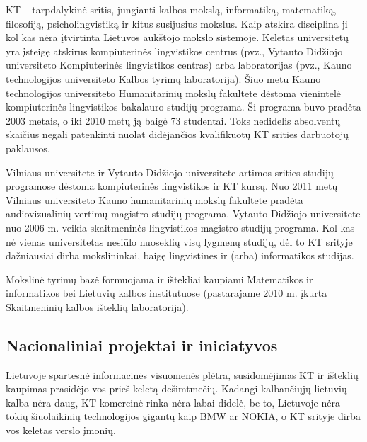 \begin{multicols}{2}
KT – tarpdalykinė sritis, jungianti kalbos mokslą, informatiką, matematiką, filosofiją, psicholingvistiką ir kitus susijusius mokslus. Kaip atskira disciplina ji kol kas nėra įtvirtinta Lietuvos aukštojo mokslo sistemoje. Keletas universitetų yra įsteigę atskirus kompiuterinės lingvistikos centrus (pvz., Vytauto Didžiojo universiteto Kompiuterinės lingvistikos centras) arba laboratorijas (pvz., Kauno technologijos universiteto Kalbos tyrimų laboratorija). Šiuo metu Kauno technologijos universiteto Humanitarinių mokslų fakultete dėstoma vienintelė kompiuterinės lingvistikos bakalauro studijų programa. Ši programa buvo pradėta 2003 metais, o iki 2010 metų ją baigė 73 studentai. Toks nedidelis absolventų skaičius negali patenkinti nuolat didėjančios kvalifikuotų KT srities darbuotojų paklausos.  

    Vilniaus universitete ir Vytauto Didžiojo universitete artimos srities studijų programose dėstoma kompiuterinės lingvistikos ir KT kursų. Nuo 2011 metų Vilniaus universiteto Kauno humanitarinių mokslų fakultete pradėta audiovizualinių vertimų magistro studijų programa. Vytauto Didžiojo universitete nuo 2006 m. veikia skaitmeninės lingvistikos magistro studijų programa. Kol kas nė vienas universitetas nesiūlo nuoseklių visų lygmenų studijų, dėl to KT srityje dažniausiai dirba mokslininkai, baigę lingvistines ir (arba) informatikos studijas. 

Mokslinė tyrimų bazė formuojama ir ištekliai kaupiami Matematikos ir informatikos bei Lietuvių kalbos institutuose (pastarajame 2010 m. įkurta Skaitmeninių kalbos išteklių laboratorija).

\subsection{Nacionaliniai projektai ir iniciatyvos}

 Lietuvoje spartesnė informacinės visuomenės plėtra, susidomėjimas KT ir išteklių kaupimas prasidėjo vos prieš keletą dešimtmečių. Kadangi kalbančiųjų lietuvių kalba nėra daug, KT komercinė rinka nėra labai didelė, be to, Lietuvoje nėra tokių šiuolaikinių technologijos gigantų kaip BMW ar NOKIA, o KT srityje dirba vos keletas verslo įmonių.  


\end{multicols}
